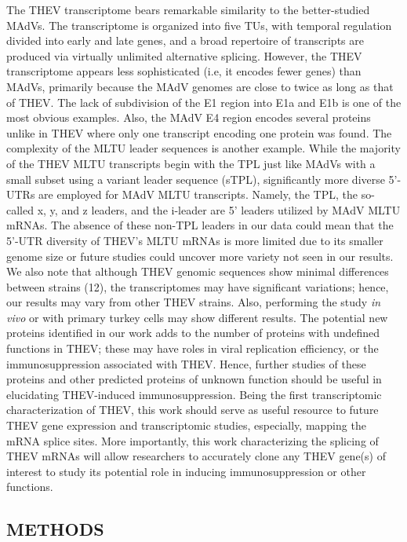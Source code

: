 \documentclass[
]{article}
\begin{document}
The THEV transcriptome bears remarkable similarity to the better-studied
MAdVs. The transcriptome is organized into five TUs, with temporal
regulation divided into early and late genes, and a broad repertoire of
transcripts are produced via virtually unlimited alternative splicing.
However, the THEV transcriptome appears less sophisticated (i.e, it
encodes fewer genes) than MAdVs, primarily because the MAdV genomes are
close to twice as long as that of THEV. The lack of subdivision of the
E1 region into E1a and E1b is one of the most obvious examples. Also,
the MAdV E4 region encodes several proteins unlike in THEV where only
one transcript encoding one protein was found. The complexity of the
MLTU leader sequences is another example. While the majority of the THEV
MLTU transcripts begin with the TPL just like MAdVs with a small subset
using a variant leader sequence (sTPL), significantly more diverse
5'-UTRs are employed for MAdV MLTU transcripts. Namely, the TPL, the
so-called x, y, and z leaders, and the i-leader are 5' leaders utilized
by MAdV MLTU mRNAs. The absence of these non-TPL leaders in our data
could mean that the 5'-UTR diversity of THEV's MLTU mRNAs is more
limited due to its smaller genome size or future studies could uncover
more variety not seen in our results. We also note that although THEV
genomic sequences show minimal differences between strains (12), the
transcriptomes may have significant variations; hence, our results may
vary from other THEV strains. Also, performing the study \emph{in vivo}
or with primary turkey cells may show different results. The potential
new proteins identified in our work adds to the number of proteins with
undefined functions in THEV; these may have roles in viral replication
efficiency, or the immunosuppression associated with THEV. Hence,
further studies of these proteins and other predicted proteins of
unknown function should be useful in elucidating THEV-induced
immunosuppression. Being the first transcriptomic characterization of
THEV, this work should serve as useful resource to future THEV gene
expression and transcriptomic studies, especially, mapping the mRNA
splice sites. More importantly, this work characterizing the splicing of
THEV mRNAs will allow researchers to accurately clone any THEV gene(s)
of interest to study its potential role in inducing immunosuppression or
other functions.

\newpage

\subsection{METHODS}\label{methods}
\end{document}
